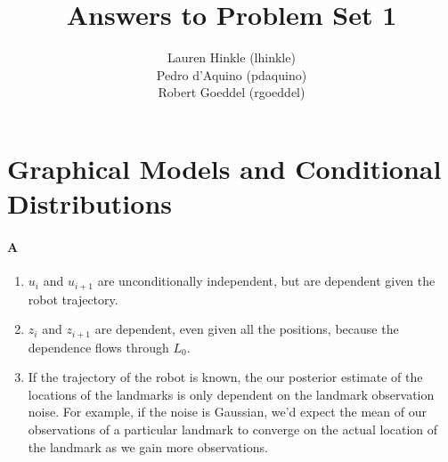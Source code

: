 \documentclass[12pt]{article}
\title{Answers to Problem Set 1}
\author{
	Lauren Hinkle (lhinkle)\\
	Pedro d'Aquino  (pdaquino)\\
	Robert Goeddel (rgoeddel)}
\begin{document}
\maketitle
\pagebreak

\section{Graphical Models and Conditional Distributions}

\paragraph{A}
\begin{enumerate}
	\item $u_i$ and $u_{i+1}$ are unconditionally independent, but are dependent given the robot trajectory.
	\item $z_i$ and $z_{i+1}$ are dependent, even given all the positions, because the dependence flows through $L_0$.
	\item If the trajectory of the robot is known, the our posterior estimate of the locations of the
    landmarks is only dependent on the landmark observation noise. For example, if the noise is Gaussian,
    we'd expect the mean of our observations of a particular landmark to converge on the actual location
    of the landmark as we gain more observations. %
\end{enumerate}
\end{document}
